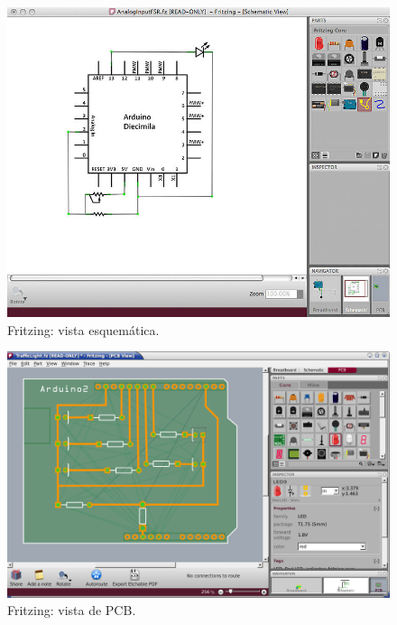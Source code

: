  \begin{figure}
  \centering
  \includegraphics[scale=0.3,keepaspectratio=true]{./imagenes/fritzing-esquema.jpg}
  \caption{Fritzing: vista esquemática.}
  \label{figura:FritzingEsquema}
 \end{figure}

 \begin{figure}
  \centering
  \includegraphics[scale=0.3,keepaspectratio=true]{./imagenes/fritzing-pcb.png}
  \caption{Fritzing: vista de PCB.}
  \label{figura:FritzingPCB}
 \end{figure}

